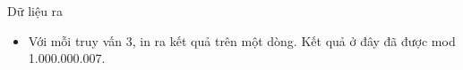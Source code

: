 Dữ liệu ra  
\begin{itemize}
	\item     Với mỗi truy vấn 3, in ra kết quả trên một dòng. Kết quả ở đây đã được mod 1.000.000.007.   
\end{itemize}